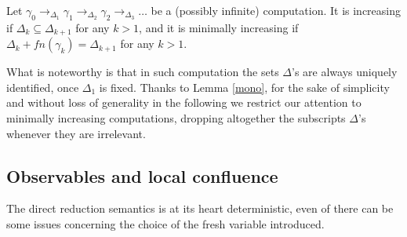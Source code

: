 \documentclass[main.tex]{subfiles}
\begin{document}
%
%
%
%
\begin{definition}\label{def:min}
Let $\gamma_0  \rightarrow_{\Delta_1} \gamma_1  \rightarrow_{\Delta_2} \gamma_2 \rightarrow_{\Delta_3} \dots$ be a
(possibly infinite) computation. 
It is increasing if $\Delta_k \subseteq \Delta_{k+1}$ for any $k >1$, and
it is minimally increasing if $\Delta_k + fn(\gamma_k) = \Delta_{k+1}$ for any $k>1$.
\end{definition}

What is noteworthy is that in such computation the sets $\Delta$'s are always uniquely identified,
once $\Delta_1$ is fixed.
Thanks to Lemma \ref{mono}, for the sake of simplicity and without loss of generality 
in the following we restrict our attention to minimally increasing computations, dropping
altogether the subscripts $\Delta$'s whenever they are irrelevant.

\subsection{Observables and local confluence}
The direct reduction semantics is at its heart deterministic, even of there can be some issues concerning the choice of the fresh variable introduced.
\end{document}
